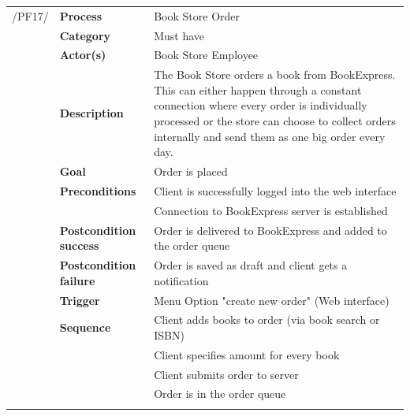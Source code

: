 \documentclass[11pt,a4paper,oneside,svgnames]{report}
\begin{document}
\noindent
\begin{tabular}{p{1.5cm}p{3cm}p{8cm}}
\cellcolor{white}/PF17/	& \textbf{Process} & Book Store Order\\ 
\cellcolor{white}		& \textbf{Category} & Must have\\
\cellcolor{white}		& \textbf{Actor(s)} & Book Store Employee\\ 
\cellcolor{white}		& \textbf{Description}	 & The Book Store orders a book from BookExpress.
This can either happen through a constant connection where every order is individually processed or the store can choose to collect orders internally and send them
as one big order every day.\\ 
\cellcolor{white}		& \textbf{Goal} & Order is placed\\
\cellcolor{white}		& \textbf{Preconditions} & Client is successfully logged into the web interface\\
\cellcolor{white}		& & Connection to BookExpress server is established\\
\cellcolor{white}		& \textbf{Postcondition success} & Order is delivered to BookExpress  and added to the order queue\\
\cellcolor{white}		& \textbf{Postcondition failure} & Order is saved as draft and client gets a notification\\
\cellcolor{white}		& \textbf{Trigger} & Menu Option "create new order" (Web interface)\\
\cellcolor{white}		& \textbf{Sequence} & Client adds books to order (via book search or ISBN)\\
\cellcolor{white}		& & Client specifies amount for every book\\
\cellcolor{white}		& & Client submits order to server\\
\cellcolor{white}		& & Order is in the order queue\\
\cellcolor{white}\hfill \\
\end{tabular}
\end{document}
